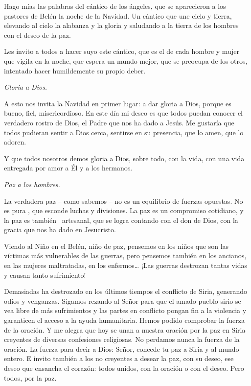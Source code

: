 Hago mías las palabras del cántico de los ángeles, que se aparecieron a los pastores de Belén la noche de la Navidad. Un cántico que une cielo y tierra, elevando al cielo la alabanza y la gloria y saludando a la tierra de los hombres con el deseo de la paz.

Les invito a todos a hacer suyo este cántico, que es el de cada hombre y mujer que vigila en la noche, que espera un mundo mejor, que se preocupa de los otros, intentado hacer humildemente su propio deber.

\emph{Gloria a Dios.}

A esto nos invita la Navidad en primer lugar: a dar gloria a Dios, porque es bueno, fiel, misericordioso. En este día mi deseo es que todos puedan conocer el verdadero rostro de Dios, el Padre que nos ha dado a Jesús. Me gustaría que todos pudieran sentir a Dios cerca, sentirse en su presencia, que lo amen, que lo adoren.

Y que todos nosotros demos gloria a Dios, sobre todo, con la vida, con una vida entregada por amor a Él y a los hermanos.

\emph{Paz a los hombres.}

La verdadera paz -- como sabemos -- no es un equilibrio de fuerzas opuestas. No es pura , que esconde luchas y divisiones. La paz es un compromiso cotidiano, y la paz es también~ artesanal, que se logra contando con el don de Dios, con la gracia que nos ha dado en Jesucristo.

Viendo al Niño en el Belén, niño de paz, pensemos en los niños que son las víctimas más vulnerables de las guerras, pero pensemos también en los ancianos, en las mujeres maltratadas, en los enfermos\ldots{} ¡Las guerras destrozan tantas vidas y causan tanto sufrimiento!

Demasiadas ha destrozado en los últimos tiempos el conflicto de Siria, generando odios y venganzas. Sigamos rezando al Señor para que el amado pueblo sirio se vea libre de más sufrimientos y las partes en conflicto pongan fin a la violencia y garanticen el acceso a la ayuda humanitaria. Hemos podido comprobar la fuerza de la oración. Y me alegra que hoy se unan a nuestra oración por la paz en Siria creyentes de diversas confesiones religiosas. No perdamos nunca la fuerza de la oración. La fuerza para decir a Dios: Señor, concede tu paz a Siria y al mundo entero. E invito también a los no creyentes a desear la paz, con su deseo, ese deseo que ensancha el corazón: todos unidos, con la oración o con el deseo. Pero todos, por la paz.

